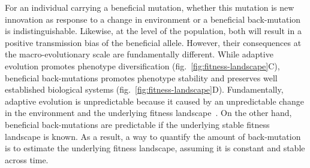\documentclass{article}
\begin{document}
    For an individual carrying a beneficial mutation, whether this mutation is new innovation as response to a change in environment or a beneficial back-mutation is indistinguishable.
    Likewise, at the level of the population, both will result in a positive transmission bias of the beneficial allele.
    However, their consequences at the macro-evolutionary scale are fundamentally different.
    While adaptive evolution promotes phenotype diversification (fig.~\ref{fig:fitness-landscape}C), beneficial back-mutations promotes phenotype stability and preserves well established biological systems (fig.~\ref{fig:fitness-landscape}D).
    Fundamentally, adaptive evolution is unpredictable because it caused by an unpredictable change in the environment and the underlying fitness landscape~\cite{bazykin_changing_2015}.
    On the other hand, beneficial back-mutations are predictable if the underlying stable fitness landscape is known.
    As a result, a way to quantify the amount of back-mutation is to estimate the underlying fitness landscape, assuming it is constant and stable across time.
\end{document}
